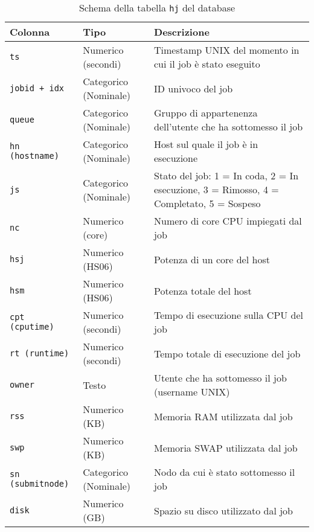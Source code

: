 \begin{table}[p]
    \centering
    \caption{Schema della tabella \texttt{hj} del database}
    \begin{tabular}{llp{6cm}}
        \toprule
        \textbf{Colonna} & \textbf{Tipo} & \textbf{Descrizione} \\
        \midrule
        \texttt{ts} & Numerico (secondi) & Timestamp UNIX del momento in
        cui il job è stato eseguito \\
        \texttt{jobid + idx} & Categorico (Nominale) & ID univoco del job \\
        \texttt{queue}  & Categorico (Nominale) & Gruppo di appartenenza
        dell'utente che ha sottomesso il job \\
        \texttt{hn (hostname)} & Categorico (Nominale) & Host sul quale il job è in esecuzione \\
        \texttt{js} & Categorico (Nominale) & Stato del job: 1 = In coda, 2 = In esecuzione, 3 = Rimosso, 4 = Completato, 5 = Sospeso \\
        \texttt{nc} & Numerico (core) & Numero di core CPU impiegati dal job \\
        \texttt{hsj} & Numerico (HS06) & Potenza di un core del host \\
        \texttt{hsm} & Numerico (HS06) & Potenza totale del host \\
        \texttt{cpt (cputime)} & Numerico (secondi) & Tempo di esecuzione sulla CPU del job\\
        \texttt{rt (runtime)} & Numerico (secondi) & Tempo totale di esecuzione del job\\
        \texttt{owner} & Testo & Utente che ha sottomesso il job (username UNIX) \\
        \texttt{rss} & Numerico (KB) & Memoria RAM utilizzata
        dal job\\
        \texttt{swp} & Numerico (KB) & Memoria SWAP utilizzata
        dal job\\
        \texttt{sn (submitnode)} & Categorico (Nominale) & Nodo da cui è stato sottomesso il job \\
        \texttt{disk} & Numerico (GB) & Spazio su disco
        utilizzato dal job \\
        \bottomrule
    \end{tabular}
    \label{table:schema_hj}
\end{table}

